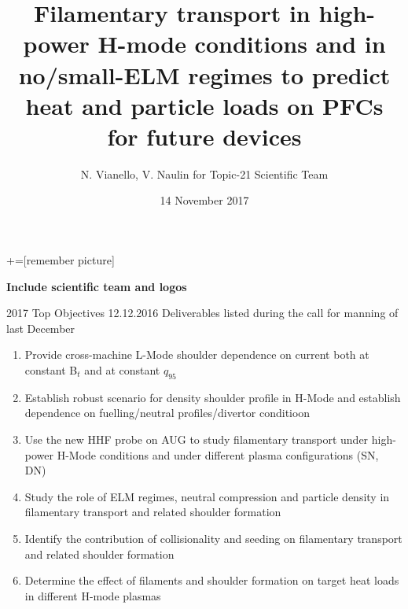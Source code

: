 \documentclass[10pt, compress]{beamer}
\title{{\small Filamentary transport in high-power H-mode conditions and in
  no/small-ELM regimes to predict heat and particle loads on PFCs for
  future devices}}
\date{{\footnotesize 14 November 2017}}
\author[N. Vianello and V. Naulin]{N. Vianello, V. Naulin for Topic-21
Scientific Team}
\newcommand\Fontvi{\fontsize{8}{7.2}\selectfont}
\begin{document}
+=[remember picture]
\maketitle
\begin{frame}
\textbf{Include scientific team and logos}
\end{frame}

\begin{frame}{2017 Top Objectives 
    12.12.2016}
  \Fontvi
\vspace{-1cm}
Deliverables listed during the call for manning of last December 
\begin{enumerate}
\item {} Provide cross-machine L-Mode
  shoulder dependence on current both at constant B$_t$ and at
  constant $q_{95}$
\item {}Establish robust scenario for density
  shoulder profile in H-Mode and establish dependence on
  fuelling/neutral profiles/divertor conditioon
\item {}Use the new HHF probe on AUG to study
  filamentary transport under high-power H-Mode conditions and under
  different plasma configurations (SN, DN)
\item {}Study the role of ELM regimes,  neutral
  compression and particle density in filamentary transport and
  related shoulder formation
\item {} Identify the contribution of
  collisionality and seeding on filamentary transport and related
  shoulder formation
\item {}Determine the effect of filaments and
  shoulder formation on target heat loads in different H-mode plasmas
\end{enumerate}
\end{frame}
\end{document}
